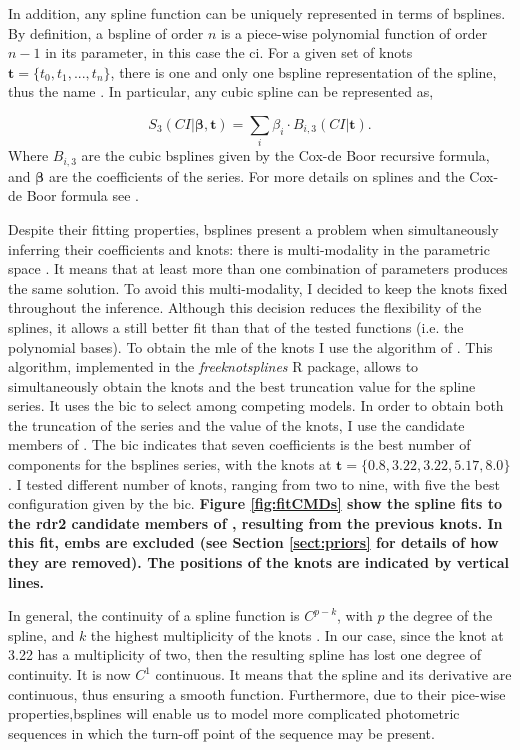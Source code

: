 In addition, any spline function can be uniquely represented in terms of \glspl{bspline}. By definition, a \gls{bspline} of order $n$ is a piece-wise polynomial function of order $n-1$ in its parameter, in this case the \gls{ci}. For a given set of knots $\mathbf{t}=\{t_0,t_1,...,t_n\}$, there is one and only one \gls{bspline} representation of the spline, thus the name .  In particular, any cubic spline can be represented as,

\begin{equation}
\label{eq:spline_cubic}
S_3(CI|\boldsymbol{\beta},\mathbf{t}) = \sum_i \beta_i\cdot B_{i,3}(CI|\mathbf{t}).
\end{equation}
Where $B_{i,3}$ are the cubic \glspl{bspline} given by the Cox-de Boor recursive formula, and $\boldsymbol{\beta}$ are the coefficients of the series. For more details on splines and the Cox-de Boor formula see \citet{deBoor1978}.

Despite their fitting properties, \glspl{bspline} present a problem when simultaneously inferring their coefficients and knots: there is multi-modality in the parametric space \citep{Lindstrom1999}. It means that at least more than one combination of parameters produces the same solution. To avoid this multi-modality, I decided to keep the knots fixed throughout the inference. Although this decision reduces the flexibility of the splines, it allows a still better fit than that of the tested functions (i.e. the polynomial bases). To obtain the \gls{mle} of the knots I use the algorithm of  \citet{Spiriti2013}. This algorithm, implemented in the \emph{freeknotsplines} R package, allows to simultaneously obtain the knots and the best truncation value for the spline series. It uses the \gls{bic} to select among competing models. In order to obtain both the truncation of the series and the value of the knots, I use the candidate members of \citet{Bouy2015}. The \gls{bic} indicates that seven coefficients is the best number of components for the \glspl{bspline} series, with the knots at $\mathbf{t}=\{0.8,3.22,3.22,5.17,8.0\}$. I tested different number of knots, ranging from two to nine, with five the best configuration given by the \gls{bic}. \textbf{Figure \ref{fig:fitCMDs} show the spline fits to the \gls{rdr2} candidate members of \citet{Bouy2015}, resulting from the previous knots. In this fit, \glspl{emb} are excluded (see Section \ref{sect:priors} for details of how they are removed). The positions of the knots are indicated by vertical lines.} 

In general, the continuity of a spline function is $C^{p-k}$, with $p$ the degree of the spline, and $k$ the highest multiplicity of the knots \citep{deBoor1978}. In our case, since the knot at 3.22 has a multiplicity of two, then the resulting spline has lost one degree of continuity. It is now $C^1$ continuous. It means that the spline and its derivative are continuous, thus ensuring a smooth function. Furthermore, due to their pice-wise properties,\glspl{bspline} will enable us to model more complicated photometric sequences in which the turn-off point of the sequence may be present.

